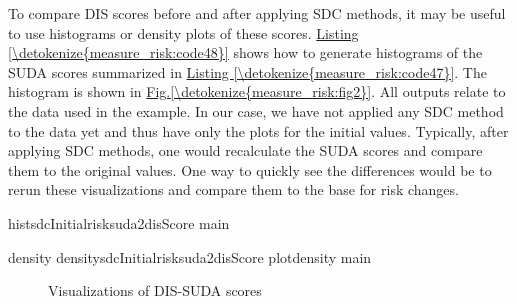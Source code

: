 \documentclass[letterpaper,10pt,english]{sphinxmanual}
\begin{document}
To compare DIS scores before and after applying SDC methods, it may be
useful to use histograms or density plots of these scores. \hyperref[\detokenize{measure_risk:code48}]{Listing \ref{\detokenize{measure_risk:code48}}}
shows how to generate histograms of the SUDA scores summarized in
\hyperref[\detokenize{measure_risk:code47}]{Listing \ref{\detokenize{measure_risk:code47}}}. The histogram is shown in \hyperref[\detokenize{measure_risk:fig2}]{Fig.\@ \ref{\detokenize{measure_risk:fig2}}}. All outputs relate to
the data used in the example. In our case, we have not applied any SDC
method to the data yet and thus have only the plots for the initial
values. Typically, after applying SDC methods, one would recalculate the
SUDA scores and compare them to the original values. One way to quickly
see the differences would be to rerun these visualizations and compare
them to the base for risk changes.

\def\sphinxLiteralBlockLabel{\label{\detokenize{measure_risk:code48}}}
%
\begin{sphinxVerbatim}[commandchars=\\\{\},numbers=left,firstnumber=1,stepnumber=1]
 histsdcInitialrisksuda2disScore main  

 density  densitysdcInitialrisksuda2disScore
 plotdensity main  
\end{sphinxVerbatim}

\begin{figure}[htbp]
\centering
\capstart

\noindent{}
\caption{Visualizations of DIS-SUDA scores}\label{\detokenize{measure_risk:fig2}}\label{\detokenize{measure_risk:id20}}\end{figure}
\end{document}
